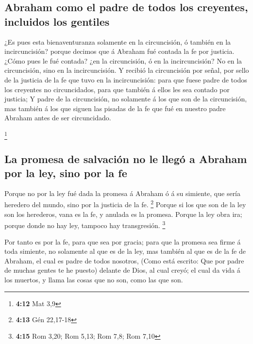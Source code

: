 \hypertarget{abraham-como-el-padre-de-todos-los-creyentes-incluidos-los-gentiles}{%
\subsection{Abraham como el padre de todos los creyentes, incluidos los
gentiles}\label{abraham-como-el-padre-de-todos-los-creyentes-incluidos-los-gentiles}}

 ¿Es pues esta bienaventuranza solamente en la
circuncisión, ó también en la incircuncisión? porque decimos que á
Abraham fué contada la fe por justicia.  ¿Cómo pues le
fué contada? ¿en la circuncisión, ó en la incircuncisión? No en la
circuncisión, sino en la incircuncisión.  Y recibió la
circuncisión por señal, por sello de la justicia de la fe que tuvo en la
incircuncisión: para que fuese padre de todos los creyentes no
circuncidados, para que también á ellos les sea contado por justicia;
 Y padre de la circuncisión, no solamente á los que son
de la circuncisión, mas también á los que siguen las pisadas de la fe
que fué en nuestro padre Abraham antes de ser circuncidado.

\footnote{\textbf{4:12} Mat 3,9}

\hypertarget{la-promesa-de-salvaciuxf3n-no-le-lleguxf3-a-abraham-por-la-ley-sino-por-la-fe}{%
\subsection{La promesa de salvación no le llegó a Abraham por la ley,
sino por la
fe}\label{la-promesa-de-salvaciuxf3n-no-le-lleguxf3-a-abraham-por-la-ley-sino-por-la-fe}}

 Porque no por la ley fué dada la promesa á Abraham ó á
su simiente, que sería heredero del mundo, sino por la justicia de la
fe. \footnote{\textbf{4:13} Gén 22,17-18}  Porque si los
que son de la ley son los herederos, vana es la fe, y anulada es la
promesa.  Porque la ley obra ira; porque donde no hay
ley, tampoco hay transgresión. \footnote{\textbf{4:15} Rom 3,20; Rom
  5,13; Rom 7,8; Rom 7,10}

 Por tanto es por la fe, para que sea por gracia; para
que la promesa sea firme á toda simiente, no solamente al que es de la
ley, mas también al que es de la fe de Abraham, el cual es padre de
todos nosotros,  (Como está escrito: Que por padre de
muchas gentes te he puesto) delante de Dios, al cual creyó; el cual da
vida á los muertos, y llama las cosas que no son, como las que son.

